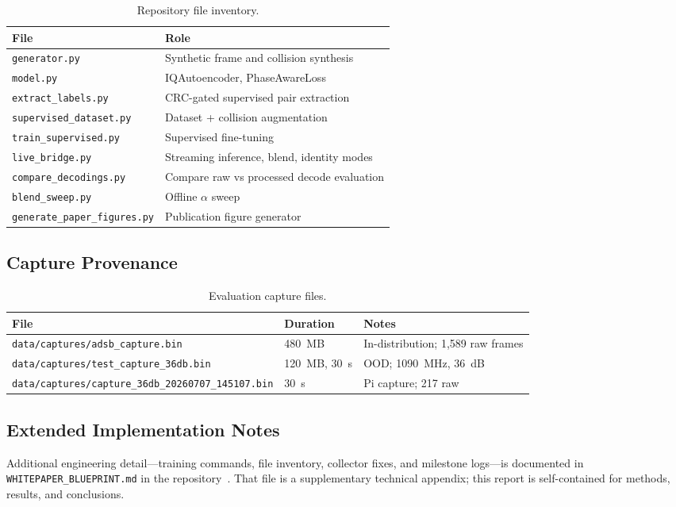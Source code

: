 \documentclass[11pt,a4paper]{article}
\begin{document}
\begin{table}[htbp]
  \centering
  \caption{Repository file inventory.}
  \label{tab:files}
  \small
  \begin{tabular}{@{}ll@{}}
    \toprule
    File & Role \\
    \midrule
    \texttt{generator.py} & Synthetic frame and collision synthesis \\
    \texttt{model.py} & IQAutoencoder, PhaseAwareLoss \\
    \texttt{extract\_labels.py} & CRC-gated supervised pair extraction \\
    \texttt{supervised\_dataset.py} & Dataset + collision augmentation \\
    \texttt{train\_supervised.py} & Supervised fine-tuning \\
    \texttt{live\_bridge.py} & Streaming inference, blend, identity modes \\
    \texttt{compare\_decodings.py} & Compare raw vs processed decode evaluation \\
    \texttt{blend\_sweep.py} & Offline $\alpha$ sweep \\
    \texttt{generate\_paper\_figures.py} & Publication figure generator \\
    \bottomrule
  \end{tabular}
\end{table}

\subsection{Capture Provenance}

\begin{table}[htbp]
  \centering
  \caption{Evaluation capture files.}
  \label{tab:captures}
  \begin{tabular}{@{}lll@{}}
    \toprule
    File & Duration & Notes \\
    \midrule
    \texttt{data/captures/adsb\_capture.bin} & 480~MB & In-distribution; 1{,}589 raw frames \\
    \texttt{data/captures/test\_capture\_36db.bin} & 120~MB, 30~s & OOD; 1090~MHz, 36~dB \\
    \texttt{data/captures/capture\_36db\_20260707\_145107.bin} & 30~s & Pi capture; 217 raw \\
    \bottomrule
  \end{tabular}
\end{table}

\subsection{Extended Implementation Notes}

Additional engineering detail---training commands, file inventory, collector
fixes, and milestone logs---is documented in
\texttt{WHITEPAPER\_BLUEPRINT.md} in the repository~\cite{adsb_repo}. That file is a
supplementary technical appendix; this report is self-contained for methods,
results, and conclusions.



\end{document}
